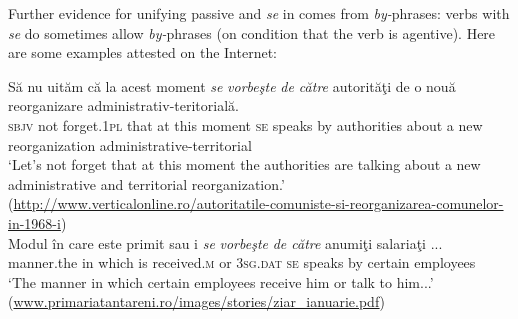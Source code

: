 \documentclass[output=paper]{langsci/langscibook}
\begin{document}
\ea%
    \label{ex:giurgea:9}
    \z
\z

Further evidence for unifying passive and  \textit{se} in  comes from \textit{by-}phrases:  verbs with  \textit{se} do sometimes allow \textit{by-}phrases (on condition that the verb is agentive). Here are some examples attested on the Internet:

\ea \label{ex:giurgea:10}
    \ea 
    \gll  Să    nu  uităm        că    la acest moment \emph{se} \emph{vorbeşte} \emph{de către}  autorităţi de    o nouă reorganizare administrativ-teritorială.\\
    \textsc{sbjv} not forget.\textsc{1pl} that at this   moment \textsc{se} speaks   by          authorities about a new  reorganization administrative-territorial\\
    \glt ‘Let’s not forget that at this moment the authorities are talking about a new administrative and territorial reorganization.’\\
    (\url{http://www.verticalonline.ro/autoritatile-comuniste-si-reorganizarea-comunelor-in-1968-i})\\
    \ex 
    \gll Modul        în care    este primit          sau i \emph{se} \emph{vorbeşte} \emph{de  către} anumiţi salariaţi ...\\
         manner.the in which is   received.\textsc{m}  or  \textsc{3sg}.\textsc{dat} \textsc{se} speaks    by certain  employees\\
    \glt ‘The manner in which certain employees receive him or talk to him...’\\
    (\url{www.primariatantareni.ro/images/stories/ziar\_ianuarie.pdf})\\
    \z
\z
\end{document}
